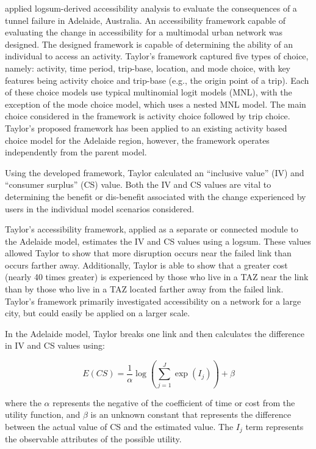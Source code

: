 \citet{taylor2008} applied logsum-derived accessibility analysis to
evaluate the consequences of a tunnel failure in Adelaide, Australia. An
accessibility framework capable of evaluating the change in accessibility
for a multimodal urban network was designed. The designed framework is
capable of determining the ability of an individual to access an activity.
Taylor's framework captured five types of choice, namely: activity, time period,
trip-base, location, and mode choice, with key features being activity
choice and trip-base (e.g., the origin point of a trip). Each of these choice
models use typical multinomial logit models (MNL), with the exception of
the mode choice model, which uses a nested MNL model. The main choice
considered in the framework is activity choice followed by trip choice.
Taylor's proposed framework has been applied to an existing activity based
choice model for the Adelaide region, however, the framework operates
independently from the parent model.

Using the developed framework, Taylor calculated an ``inclusive value'' (IV)
and ``consumer surplus'' (CS) value. Both the IV and CS values are vital to
determining the benefit or dis-benefit
associated with the change experienced by users in the individual model
scenarios considered.

Taylor's accessibility framework, applied as a separate or connected module to
the Adelaide model, estimates the IV and CS values using a logsum.
These values allowed Taylor to show that more disruption occurs near the
failed link than occurs farther away. Additionally, Taylor is able to show
that a greater cost (nearly 40 times greater) is experienced by those who
live in a TAZ near the link than by those who live in a TAZ located
farther away from the failed link. Taylor's framework primarily
investigated accessibility on a network for a large city,
but could easily be applied on a larger scale.

In the Adelaide model, Taylor breaks one link and
then calculates the difference in IV and CS values using:

	\begin{equation}
		E(CS) = \frac{1}{\alpha} \log (\sum_{j = 1}^{J} \exp (I_j)) + \beta
			\label{eqn:taylor}
	\end{equation}

\noindent where the \(\alpha\) represents the negative of the coefficient of time or cost from the utility function,
and \(\beta\) is an unknown constant that represents the difference between the actual value of CS and the estimated value.
The \(I_j\) term represents the observable attributes of the possible utility.

